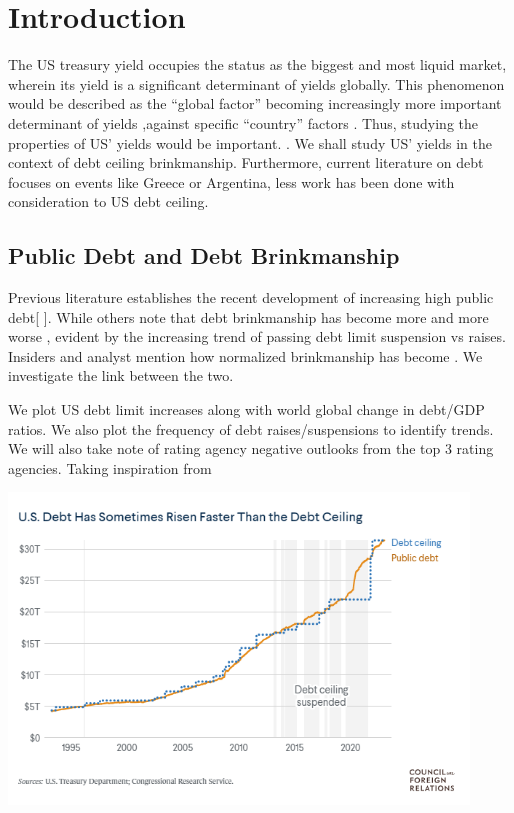 \documentclass[
  12pt]{article}
\begin{document}
\hypertarget{introduction}{%
\section{Introduction}\label{introduction}}

The US treasury yield occupies the status as the biggest and most liquid
market, wherein its yield is a significant determinant of yields
globally. This phenomenon would be described as the ``global factor''
becoming increasingly more important determinant of yields ,against
specific ``country'' factors \citep{mauro2002}. Thus, studying the
properties of US' yields would be important.
\citep{rozada2006, gonzález-rozada2008, longstaff2011}. We shall study
US' yields in the context of debt ceiling brinkmanship. Furthermore,
current literature on debt focuses on events like Greece or Argentina,
less work has been done with consideration to US debt ceiling.

\hypertarget{public-debt-and-debt-brinkmanship}{%
\subsection{Public Debt and Debt
Brinkmanship}\label{public-debt-and-debt-brinkmanship}}

Previous literature establishes the recent development of increasing
high public debt{[} \citet{mitchener2023} {]}. While others note that
debt brinkmanship has become more and more worse \citep{berman} ,
evident by the increasing trend of passing debt limit suspension vs
raises. Insiders and analyst mention how normalized brinkmanship has
become \citep{bivens} . We investigate the link between the two.

We plot US debt limit increases along with world global change in
debt/GDP ratios. We also plot the frequency of debt raises/suspensions
to identify trends. We will also take note of rating agency negative
outlooks from the top 3 rating agencies. Taking inspiration from

\includegraphics[width=4.8125in,height=\textheight]{style-guide/Debt plot.png}
\end{document}
